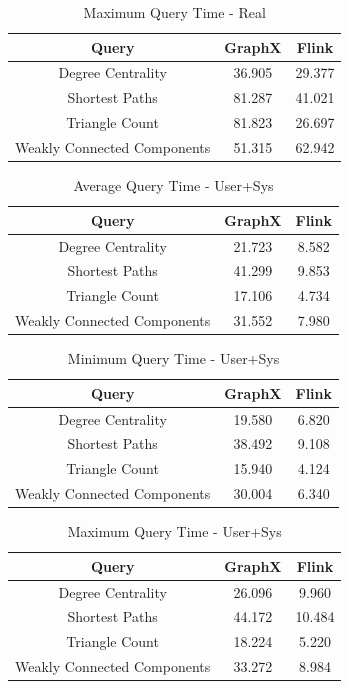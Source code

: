\documentclass[conference]{IEEEtran}
\begin{document}
\begin{table}[htbp]
\caption{Maximum Query Time - Real}
\centering
\begin{tabular}{|c|c|c|}
\hline
\textbf{Query} & \textbf{GraphX} & \textbf{Flink}\\
\hline
Degree Centrality & 36.905 & 29.377 \\
\hline
Shortest Paths & 81.287 & 41.021 \\
\hline
Triangle Count & 81.823 & 26.697 \\
\hline
Weakly Connected Components & 51.315 & 62.942 \\
\hline
\end{tabular}
\end{table}

\begin{table}[htbp]
\caption{Average Query Time - User+Sys}
\centering
\begin{tabular}{|c|c|c|}
\hline
\textbf{Query} & \textbf{GraphX} & \textbf{Flink}\\
\hline
Degree Centrality & 21.723 & 8.582 \\
\hline
Shortest Paths & 41.299 & 9.853 \\
\hline
Triangle Count & 17.106 & 4.734 \\
\hline
Weakly Connected Components & 31.552 & 7.980 \\
\hline
\end{tabular}
\end{table}

\begin{table}[htbp]
\caption{Minimum Query Time - User+Sys}
\centering
\begin{tabular}{|c|c|c|}
\hline
\textbf{Query} & \textbf{GraphX} & \textbf{Flink}\\
\hline
Degree Centrality & 19.580 & 6.820 \\
\hline
Shortest Paths & 38.492 & 9.108 \\
\hline
Triangle Count & 15.940 & 4.124 \\
\hline
Weakly Connected Components & 30.004 & 6.340 \\
\hline
\end{tabular}
\end{table}

\begin{table}[htbp]
\caption{Maximum Query Time - User+Sys}
\centering
\begin{tabular}{|c|c|c|}
\hline
\textbf{Query} & \textbf{GraphX} & \textbf{Flink}\\
\hline
Degree Centrality & 26.096 & 9.960 \\
\hline
Shortest Paths & 44.172 & 10.484 \\
\hline
Triangle Count & 18.224 & 5.220 \\
\hline
Weakly Connected Components & 33.272 & 8.984 \\
\hline
\end{tabular}
\end{table}
\end{document}
